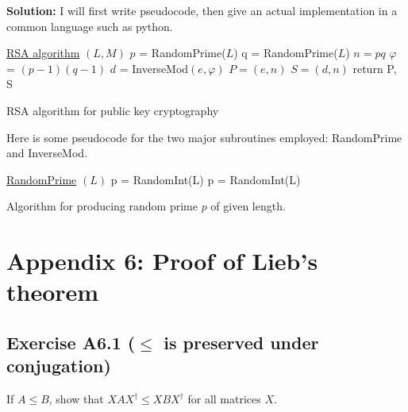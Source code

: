 \documentclass{book}
\begin{document}
    \textbf{Solution:} I will first write pseudocode, then give an actual implementation in a common language such as python.
    \begin{algorithm}
        
        \underline{RSA algorithm} $(L,M)$\;
        $p$ = RandomPrime($L$)\;
        q = RandomPrime($L$)\;
        $n = pq$\;
        $\varphi$ = $(p-1)(q-1)$\;
        $d$ = InverseMod$(e, \varphi)$\;
        $P = (e, n)$\;
        $S= (d,n)$\;
        return P, S
        \caption{RSA algorithm for public key cryptography}
    \end{algorithm}
    Here is some pseudocode for the two major subroutines employed: RandomPrime and InverseMod.
    \begin{algorithm}
        \underline{RandomPrime} $(L)$\;
        p = RandomInt(L)\;
            {
            p = RandomInt(L)\;
            }
        \caption{Algorithm for producing random prime $p$ of given length.}
    \end{algorithm}


\chapter*{Appendix 6: Proof of Lieb's theorem}


\section*{Exercise A6.1 ($\leq$ is preserved under conjugation)}
    If $A\leq B$, show that $XAX^\dagger \leq XBX^\dagger$ for all matrices $X$.
    
\end{document}
